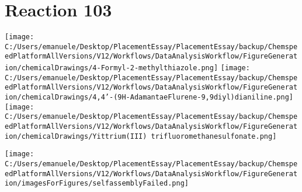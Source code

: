 \documentclass{article}%
\begin{document}
\section*{Reaction 103}%
%
\begin{scheme}[H]%
\begin{minipage}{0.5\textwidth}%
\texttt{[image: C:/Users/emanuele/Desktop/PlacementEssay/PlacementEssay/backup/ChemspeedPlatformAllVersions/V12/Workflows/DataAnalysisWorkflow/FigureGeneration/chemicalDrawings/4-Formyl-2-methylthiazole.png]}%
\texttt{[image: C:/Users/emanuele/Desktop/PlacementEssay/PlacementEssay/backup/ChemspeedPlatformAllVersions/V12/Workflows/DataAnalysisWorkflow/FigureGeneration/chemicalDrawings/4,4'-(9H-AdamantaeFlurene-9,9diyl)dianiline.png]}%
\texttt{[image: C:/Users/emanuele/Desktop/PlacementEssay/PlacementEssay/backup/ChemspeedPlatformAllVersions/V12/Workflows/DataAnalysisWorkflow/FigureGeneration/chemicalDrawings/Yittrium(III) trifluoromethanesulfonate.png]}%
\end{minipage}%
\begin{minipage}{0.5\textwidth}%
\begin{center}%
\texttt{[image: C:/Users/emanuele/Desktop/PlacementEssay/PlacementEssay/backup/ChemspeedPlatformAllVersions/V12/Workflows/DataAnalysisWorkflow/FigureGeneration/imagesForFigures/selfassemblyFailed.png]}%
\end{center}%
\end{minipage}%
\caption{Self-assembly of components 1, 13, with Yittrium(III) in a 3.0:1.5:1.0 molar ratio in CH$_3$CN at 60\textdegree C for 40h. These are the reagents (starting materials) for reaction 103.}%
\end{scheme}%
\end{document}

